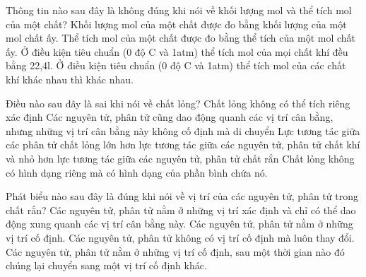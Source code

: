 \begin{ex}
Thông tin nào sau đây là không đúng khi nói về khối lượng mol và thể tích mol của một chất?
\choice
{Khối lượng mol của một chất được đo bằng khối lượng của một mol chất ấy.}
{Thể tích mol của một chất được đo bằng thể tích của một mol chất ấy.}
{Ở điều kiện tiêu chuẩn (0 độ C và 1atm) thể tích mol của mọi chất khí đều bằng 22,4l.}
{\True Ở điều kiện tiêu chuẩn (0 độ C và 1atm) thể tích mol của các chất khí khác nhau thì khác nhau.}
\end{ex}


\begin{ex}
Điều nào sau đây là sai khi nói về chất lỏng?
\choice
{\True Chất lỏng không có thể tích riêng xác định}
{Các nguyên tử, phân tử cũng dao động quanh các vị trí cân bằng, nhưng những vị trí cân bằng này không cố định mà di chuyển}
{Lực tương tác giữa các phân tử chất lỏng lớn hơn lực tương tác giữa các nguyên tử, phân tử chất khí và nhỏ hơn lực tương tác giữa các nguyên tử, phân tử chất rắn}
{Chất lỏng không có hình dạng riêng mà có hình dạng của phần bình chứa nó.}
\end{ex}

\begin{ex}
Phát biểu nào sau đây là đúng khi nói về vị trí của các nguyên tử, phân tử trong chất rắn?
\choice
{\True Các nguyên tử, phân tử nằm ở những vị trí xác định và chỉ có thể dao động xung quanh các vị trí cân bằng này.}
{Các nguyên tử, phân tử nằm ở những vị trí cố định.}
{Các nguyên tử, phân tử không có vị trí cố định mà luôn thay đổi.}
{Các nguyên tử, phân tử nằm ở những vị trí cố định, sau một thời gian nào đó chúng lại chuyển sang một vị trí cố định khác.}
\end{ex}

